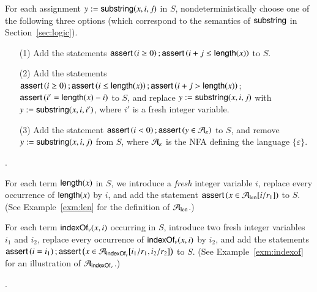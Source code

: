 %
For each assignment $y:=\mathsf{substring}(x, i, j)$ in $S$, nondeterministically choose one of the following three options (which correspond to the semantics of $\mathsf{substring}$ in Section~\ref{sec:logic}).
\begin{itemize}
\item[(1)] Add the statements $\textsf{assert}\left(i \ge 0\right); \textsf{assert}\left(i + j \le \mathsf{length}(x)\right)$ to $S$. 
%
\item[(2)] Add the statements 
$\textsf{assert}\left(i \ge 0\right); \textsf{assert}\left(i \le \mathsf{length}(x)\right);\textsf{assert}\left(i+j  > \mathsf{length}(x)\right)$; $\textsf{assert}\left(i'  = \mathsf{length}(x)-i\right)$
to $S$, and replace $y:=\mathsf{substring}(x, i, j)$ with $y:=\mathsf{substring}(x, i, i')$, where $i'$ is a fresh integer variable.
%
\item[(3)] Add the statement $\textsf{assert}\left(i < 0\right); \textsf{assert}\left(y \in \mathcal{A}_\varepsilon\right)$ to $S$, and  remove $y:=\mathsf{substring}(x, i, j)$ from $S$, where $\mathcal{A}_\varepsilon$ is the NFA defining the language $\{\varepsilon\}$.
\end{itemize}

\medskip
{}.

\smallskip


For each term $\mathsf{length}(x)$ in $S$, we introduce a \emph{fresh} integer variable $i$, replace every occurrence of $\mathsf{length}(x)$ by $i$, and add the statement $\textsf{assert}\left(x \in \mathcal{A}_{\rm len}[i/r_1]\right)$ to $S$. (See Example~\ref{exm:len} for the definition of $\mathcal{A}_{\rm len}$.)  

For each term $\mathsf{indexOf}_v(x, i)$ occurring in $S$, introduce two fresh integer variables $i_1$ and $i_2$, replace every occurrence of $\mathsf{indexOf}_v(x, i)$ by $i_2$, and add the statements $\textsf{assert}\left(i=i_1\right); \textsf{assert}\left(x \in \mathcal{A}_{\mathsf{indexOf}_v}[i_1/r_1, i_2/r_2]\right)$ to $S$.  (See Example~\ref{exm:indexof} for an illustration of $\mathcal{A}_{\rm \mathsf{indexOf}_v}$.)

%
%

\medskip
{}.

\smallskip

